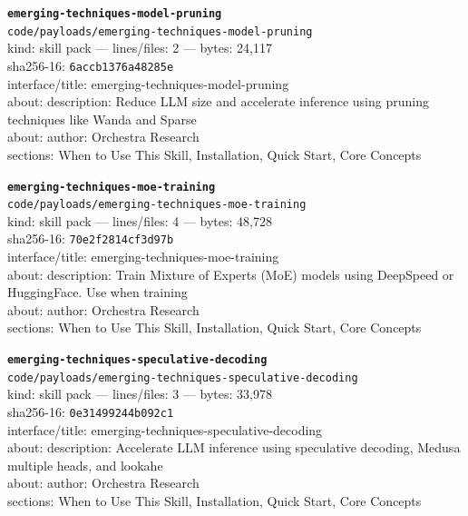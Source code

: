 \noindent\textbf{\texttt{emerging-techniques-model-pruning}}\\
\texttt{code/payloads/emerging-techniques-model-pruning}\\
kind: skill pack --- lines/files: 2 --- bytes: 24,117\\
sha256-16: \texttt{6accb1376a48285e}\\
interface/title: emerging-techniques-model-pruning\\
about: description: Reduce LLM size and accelerate inference using pruning techniques like Wanda and Sparse\\
about: author: Orchestra Research\\
sections: When to Use This Skill, Installation, Quick Start, Core Concepts\\
\vspace*{6.0pt}

\noindent\textbf{\texttt{emerging-techniques-moe-training}}\\
\texttt{code/payloads/emerging-techniques-moe-training}\\
kind: skill pack --- lines/files: 4 --- bytes: 48,728\\
sha256-16: \texttt{70e2f2814cf3d97b}\\
interface/title: emerging-techniques-moe-training\\
about: description: Train Mixture of Experts (MoE) models using DeepSpeed or HuggingFace. Use when training\\
about: author: Orchestra Research\\
sections: When to Use This Skill, Installation, Quick Start, Core Concepts\\
\vspace*{6.0pt}

\noindent\textbf{\texttt{emerging-techniques-speculative-decoding}}\\
\texttt{code/payloads/emerging-techniques-speculative-decoding}\\
kind: skill pack --- lines/files: 3 --- bytes: 33,978\\
sha256-16: \texttt{0e31499244b092c1}\\
interface/title: emerging-techniques-speculative-decoding\\
about: description: Accelerate LLM inference using speculative decoding, Medusa multiple heads, and lookahe\\
about: author: Orchestra Research\\
sections: When to Use This Skill, Installation, Quick Start, Core Concepts\\
\vspace*{6.0pt}
\newpage


